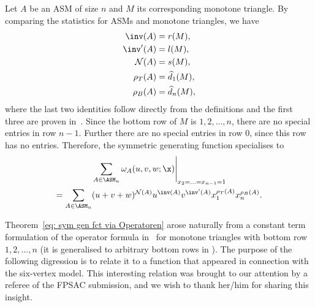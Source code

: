 Let $A$ be an ASM of size $n$ and $M$ its corresponding monotone triangle. By comparing the statistics for ASMs and monotone triangles, we have
\begin{align*}
\inv(A) &= r(M), \\
\inv^\prime(A) &= l(M),\\
\mathcal{N}(A) &= s(M),\\
\rho_T(A) &= \widehat{d}_1(M),\\
\rho_B(A) &= \widehat{d}_n(M),
\end{align*}
where the last two identities follow directly from the definitions and the first three are proven in~\cite{FischerSchreierAigner23}.
Since the bottom row of $M$ is $1,2,\ldots,n$, there are no special entries in row $n-1$. Further there are no special entries in row $0$, since this row has no entries. Therefore, the symmetric generating function specialises to
\begin{multline}
\label{eq: specialisation of sym gen fct}
\left. \sum_{A \in \ASM_n} \omega_A(u,v,w;\x) \right|_{x_2 = \ldots =x_{n-1}=1} \\=
\sum_{A \in \ASM_n}  (u+ v+w)^{\mathcal{N}(A)}  u^{\inv(A)}  v^{\inv^\prime(A)} x_1^{\rho_T(A)} x_n^{\rho_B(A)}.
\end{multline}

Theorem~\ref{eq: sym gen fct via Operatoren} arose naturally from a constant term formulation of the operator formula in~\cite{Fischer06} for monotone triangles with bottom row $1,2,\ldots,n$ (it is generalised to arbitrary bottom rows in \cite[Theorem 3.1]{FischerSchreierAigner23}). The purpose of the following digression is to relate it to a function that appeared in connection with the six-vertex model. This interesting relation was brought to our attention by a referee of the FPSAC submission, and we wish to thank her/him for sharing this insight.

